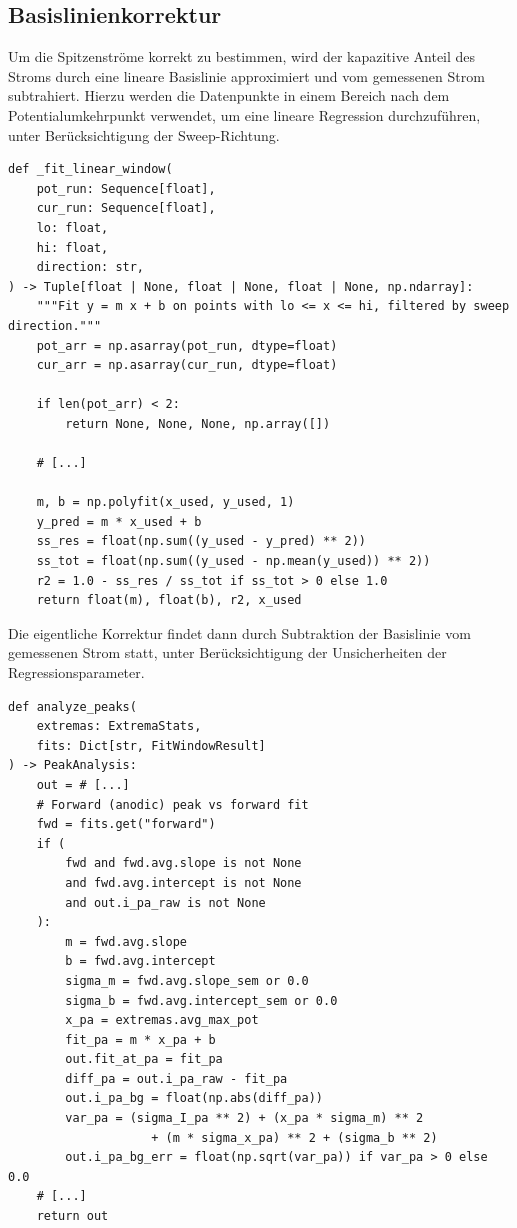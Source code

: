 \subsection{Basislinienkorrektur}
Um die Spitzenströme korrekt zu bestimmen, wird der kapazitive Anteil des Stroms durch eine lineare Basislinie approximiert und vom gemessenen Strom subtrahiert.
Hierzu werden die Datenpunkte in einem Bereich nach dem Potentialumkehrpunkt verwendet, um eine lineare Regression durchzuführen, unter Berücksichtigung der Sweep-Richtung.
\begin{verbatim}
def _fit_linear_window(
    pot_run: Sequence[float],
    cur_run: Sequence[float],
    lo: float,
    hi: float,
    direction: str,
) -> Tuple[float | None, float | None, float | None, np.ndarray]:
    """Fit y = m x + b on points with lo <= x <= hi, filtered by sweep direction."""
    pot_arr = np.asarray(pot_run, dtype=float)
    cur_arr = np.asarray(cur_run, dtype=float)

    if len(pot_arr) < 2:
        return None, None, None, np.array([])

    # [...]

    m, b = np.polyfit(x_used, y_used, 1)
    y_pred = m * x_used + b
    ss_res = float(np.sum((y_used - y_pred) ** 2))
    ss_tot = float(np.sum((y_used - np.mean(y_used)) ** 2))
    r2 = 1.0 - ss_res / ss_tot if ss_tot > 0 else 1.0
    return float(m), float(b), r2, x_used
\end{verbatim}

Die eigentliche Korrektur findet dann durch Subtraktion der Basislinie vom gemessenen Strom statt, unter Berücksichtigung der Unsicherheiten der Regressionsparameter.
\begin{verbatim}
def analyze_peaks(
    extremas: ExtremaStats,
    fits: Dict[str, FitWindowResult]
) -> PeakAnalysis:
    out = # [...]
    # Forward (anodic) peak vs forward fit
    fwd = fits.get("forward")
    if (
        fwd and fwd.avg.slope is not None 
        and fwd.avg.intercept is not None
        and out.i_pa_raw is not None
    ):
        m = fwd.avg.slope
        b = fwd.avg.intercept
        sigma_m = fwd.avg.slope_sem or 0.0
        sigma_b = fwd.avg.intercept_sem or 0.0
        x_pa = extremas.avg_max_pot
        fit_pa = m * x_pa + b
        out.fit_at_pa = fit_pa
        diff_pa = out.i_pa_raw - fit_pa
        out.i_pa_bg = float(np.abs(diff_pa))
        var_pa = (sigma_I_pa ** 2) + (x_pa * sigma_m) ** 2
                    + (m * sigma_x_pa) ** 2 + (sigma_b ** 2)
        out.i_pa_bg_err = float(np.sqrt(var_pa)) if var_pa > 0 else 0.0
    # [...]
    return out
\end{verbatim}

